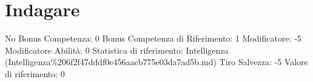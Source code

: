\section{Indagare}\label{indagare}

\begin{description}
\tightlist
\item[Tags: ABI]
No Bonus Competenza: 0 Bonus Competenza di Riferimento: 1 Modificatore:
-5 Modificatore Abilità: 0 Statistica di riferimento: Intelligenza
(Intelligenza\%206f2f47dddf0e456aacb775e03da7ad5b.md) Tiro Salvezza: -5
Valore di riferimento: 0
\end{description}
